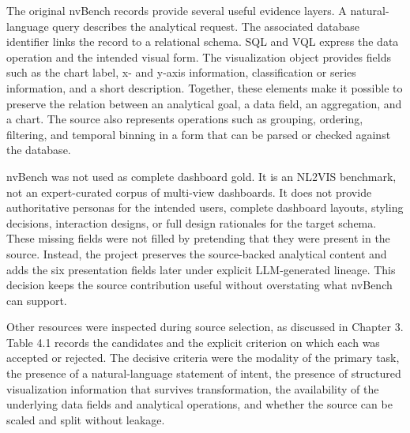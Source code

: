 The original nvBench records provide several useful evidence layers. A natural-language query describes the analytical request. The associated database identifier links the record to a relational schema. SQL and VQL express the data operation and the intended visual form. The visualization object provides fields such as the chart label, x- and y-axis information, classification or series information, and a short description. Together, these elements make it possible to preserve the relation between an analytical goal, a data field, an aggregation, and a chart. The source also represents operations such as grouping, ordering, filtering, and temporal binning in a form that can be parsed or checked against the database.

nvBench was not used as complete dashboard gold. It is an NL2VIS benchmark, not an expert-curated corpus of multi-view dashboards. It does not provide authoritative personas for the intended users, complete dashboard layouts, styling decisions, interaction designs, or full design rationales for the target schema. These missing fields were not filled by pretending that they were present in the source. Instead, the project preserves the source-backed analytical content and adds the six presentation fields later under explicit LLM-generated lineage. This decision keeps the source contribution useful without overstating what nvBench can support.

Other resources were inspected during source selection, as discussed in Chapter 3. Table 4.1 records the candidates and the explicit criterion on which each was accepted or rejected. The decisive criteria were the modality of the primary task, the presence of a natural-language statement of intent, the presence of structured visualization information that survives transformation, the availability of the underlying data fields and analytical operations, and whether the source can be scaled and split without leakage.

